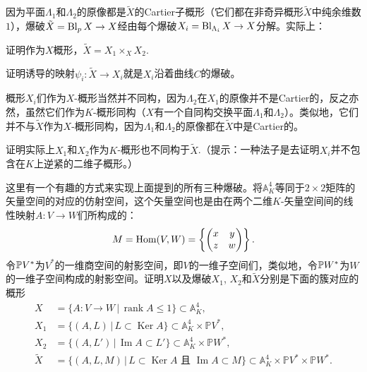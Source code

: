 因为平面$\Lambda_1$和$\Lambda_2$的原像都是$\tilde X$的Cartier子概形（它们都在非奇异概形$\tilde X$中纯余维数$1$），爆破$\tilde X=\operatorname{Bl}_pX\to X$经由每个爆破$X_i=\operatorname{Bl}_{\Lambda_i}X\to X$分解。实际上：

\begin{exe}\label{exe:4.31} 
	\begin{compactenum}[(a)]
		\item 证明作为$X$概形，$\tilde X=X_1\times_X X_2$.
		\item 证明诱导的映射$\psi_i:\tilde X\to X_i$就是$X_i$沿着曲线$C$的爆破。
	\end{compactenum}
\end{exe}

概形$X_i$们作为$X$-概形当然并不同构，因为$\Lambda_2$在$X_1$的原像并不是Cartier的，反之亦然，虽然它们作为$K$-概形同构（$X$有一个自同构交换平面$\Lambda_1$和$\Lambda_2$）。类似地，它们并不与$\tilde X$作为$X$-概形同构，因为$\Lambda_1$和$\Lambda_2$的原像都在$\tilde X$中是Cartier的。

\begin{exe}\label{exe:4.32} 
	证明实际上$X_1$和$X_2$作为$K$-概形也不同构于$\tilde X$.（提示：一种法子是去证明$X_i$并不包含在$K$上逆紧的二维子概形。）
\end{exe}

\begin{exe}\label{exe:4.33} 
	这里有一个有趣的方式来实现上面提到的所有三种爆破。将$\mathbb A_K^4$等同于$2\times 2$矩阵的矢量空间的对应的仿射空间，这个矢量空间也是由在两个二维$K$-矢量空间间的线性映射$A:V\to W$们所构成的：
	\[
	M=\operatorname{Hom}(V,W)=\left\{\begin{pmatrix}x&y\\z&w\end{pmatrix}\right\}.
	\]
	令$\mathbb{P} V^*$为$V^*$的一维商空间的射影空间，即$V$的一维子空间们，类似地，令$\mathbb{P} W^*$为$W$的一维子空间构成的射影空间。证明$X$以及爆破$X_1$, $X_2$和$\tilde X$分别是下面的簇对应的概形
	\[
	\begin{aligned}
		X&=\{A:V\to W\,|\,\operatorname{rank}A\leq 1\}\subset \mathbb A_K^4,\\
		X_1&=\{(A,L)\,|\,L\subset \operatorname{Ker}A\}\subset \mathbb A_K^4\times \mathbb PV^*,\\
		X_2&=\{(A,L')\,|\,\operatorname{Im}A\subset L'\}\subset \mathbb A_K^4\times \mathbb PW^*,\\
		\tilde X&=\{(A,L,M)\,|\, L\subset \operatorname{Ker}A\text{ 且 }\operatorname{Im}A\subset M\}\subset \mathbb A_K^4\times \mathbb PV^*\times \mathbb PW^*.
	\end{aligned}
	\]
\end{exe}

